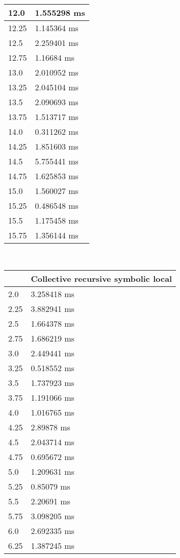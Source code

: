 \begin{multicols}{2}
\begin{tabular}{|l|l|}
		12.0 & 1.555298 ms \\ \hline
		12.25 & 1.145364 ms \\ \hline
		12.5 & 2.259401 ms \\ \hline
		12.75 & 1.16684 ms \\ \hline
		13.0 & 2.010952 ms \\ \hline
		13.25 & 2.045104 ms \\ \hline
		13.5 & 2.090693 ms \\ \hline
		13.75 & 1.513717 ms \\ \hline
		14.0 & 0.311262 ms \\ \hline
		14.25 & 1.851603 ms \\ \hline
		14.5 & 5.755441 ms \\ \hline
		14.75 & 1.625853 ms \\ \hline
		15.0 & 1.560027 ms \\ \hline
		15.25 & 0.486548 ms \\ \hline
		15.5 & 1.175458 ms \\ \hline
		15.75 & 1.356144 ms \\ \hline
	\end{tabular}\\
	\begin{tabular}{|l|l|}
		\hline
		& Collective recursive symbolic local \\ \hline
		2.0 & 3.258418 ms \\ \hline
		2.25 & 3.882941 ms \\ \hline
		2.5 & 1.664378 ms \\ \hline
		2.75 & 1.686219 ms \\ \hline
		3.0 & 2.449441 ms \\ \hline
		3.25 & 0.518552 ms \\ \hline
		3.5 & 1.737923 ms \\ \hline
		3.75 & 1.191066 ms \\ \hline
		4.0 & 1.016765 ms \\ \hline
		4.25 & 2.89878 ms \\ \hline
		4.5 & 2.043714 ms \\ \hline
		4.75 & 0.695672 ms \\ \hline
		5.0 & 1.209631 ms \\ \hline
		5.25 & 0.85079 ms \\ \hline
		5.5 & 2.20691 ms \\ \hline
		5.75 & 3.098205 ms \\ \hline
		6.0 & 2.692335 ms \\ \hline
		6.25 & 1.387245 ms \\ \hline

\end{tabular}
\end{multicols}
